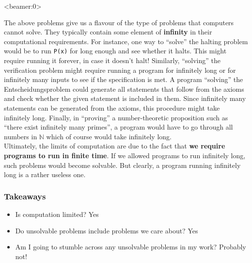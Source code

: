 \documentclass[handout, 12pt]{beamer}
\newcommand{\N}{\mathbb{N}}
\begin{document}
\begin{frame}<beamer:0>

\footnotesize
The above problems give us a flavour of the type of problems that computers cannot solve. They typically contain some element of \textbf{infinity} in their computational requirements. For instance, one way to ``solve'' the halting problem would be to run \texttt{P(x)} for long enough and see whether it halts. This might require running it forever, in case it doesn't halt! Similarly, ``solving'' the verification problem might require running a program for infinitely long or for infinitely many inputs to see if the specification is met. A program ``solving'' the Entscheidungsproblem could generate all statements that follow from the axioms and check whether the given statement is included in them. Since infinitely many statements can be generated from the axioms, this procedure might take infinitely long. Finally, in ``proving'' a number-theoretic proposition such as ``there exist infinitely many primes'', a program would have to go through all numbers in $\N$ which of course would take infinitely long.
\\[0.6em]
Ultimately, the limits of computation are due to the fact that \textbf{we require programs to run in finite time}. If we allowed programs to run infinitely long, such problems would become solvable. But clearly, a program running infinitely long is a rather useless one.

\end{frame}

\begin{frame}

\frametitle{Takeaways}

\begin{itemize}
\addtolength{\itemsep}{1\baselineskip}
\pause\item Is computation limited? {\color{r} Yes}
\pause\item Do unsolvable problems include problems we care about? {\color{r} Yes}
\pause\item Am I going to stumble across any unsolvable problems in my work? {\color{r} Probably not!}
\end{itemize}

\end{frame}
\end{document}
